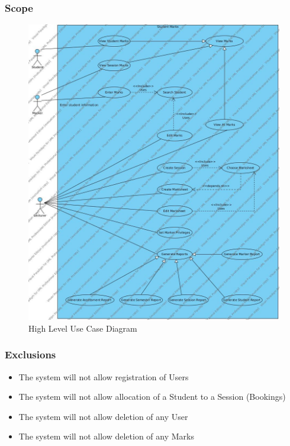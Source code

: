 \documentclass[a4paper]{article}
\begin{document}
			\subsubsection{Scope}
			\begin{figure}[H]
				\caption{High Level Use Case Diagram}
				\includegraphics[width=1\textwidth]{StudentMarks}
			\end{figure}
			\subsubsection{Exclusions}
				\begin{itemize}
				
					\item{The system will not allow registration of Users}
					
					\item{The system will not allow allocation of a Student to a Session (Bookings)}
					
					\item{The system will not allow deletion of any User}
					
					\item{The system will not allow deletion of any Marks}
				
				\end{itemize}
\end{document}
